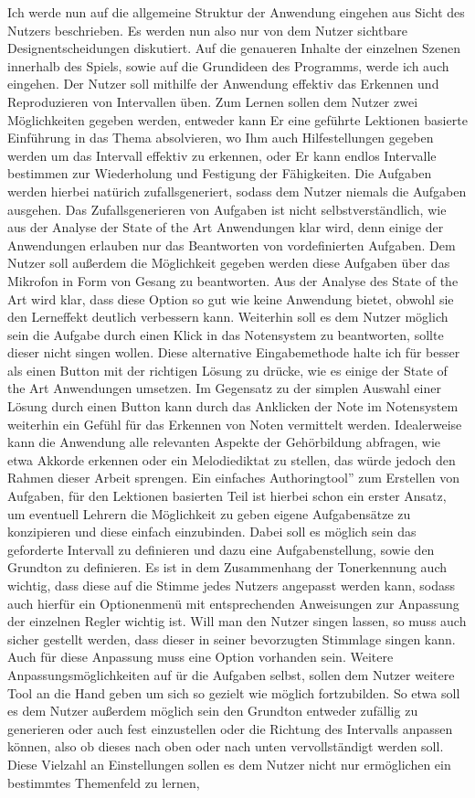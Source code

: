 Ich werde nun auf die allgemeine Struktur der Anwendung eingehen aus Sicht des Nutzers beschrieben. Es werden nun also nur von dem Nutzer sichtbare Designentscheidungen diskutiert. Auf die genaueren Inhalte der einzelnen Szenen innerhalb des Spiels, sowie auf die Grundideen des Programms, werde ich auch eingehen. Der Nutzer soll mithilfe der Anwendung effektiv das Erkennen und Reproduzieren von Intervallen üben. Zum Lernen sollen dem Nutzer zwei Möglichkeiten gegeben werden, entweder kann Er eine geführte Lektionen basierte Einführung in das Thema absolvieren, wo Ihm auch Hilfestellungen gegeben werden um das Intervall effektiv zu erkennen, oder Er kann endlos Intervalle bestimmen zur Wiederholung und Festigung der Fähigkeiten. Die Aufgaben werden hierbei natürich zufallsgeneriert, sodass dem Nutzer niemals die Aufgaben ausgehen. Das Zufallsgenerieren von Aufgaben ist nicht selbstverständlich, wie aus der Analyse der State of the Art Anwendungen klar wird, denn einige der Anwendungen erlauben nur das Beantworten von vordefinierten Aufgaben. Dem Nutzer soll außerdem die Möglichkeit gegeben werden diese Aufgaben über das Mikrofon in Form von Gesang zu beantworten. Aus der Analyse des State of the Art wird klar, dass diese Option so gut wie keine Anwendung bietet, obwohl sie den Lerneffekt deutlich verbessern kann. Weiterhin soll es dem Nutzer möglich sein die Aufgabe durch einen Klick in das Notensystem zu beantworten, sollte dieser nicht singen wollen. Diese alternative Eingabemethode halte ich für besser als einen Button mit der richtigen Lösung zu drücke, wie es einige der State of the Art Anwendungen umsetzen. Im Gegensatz zu der simplen Auswahl einer Lösung durch einen Button kann durch das Anklicken der Note im Notensystem weiterhin ein Gefühl für das Erkennen von Noten vermittelt werden. Idealerweise kann die Anwendung alle relevanten Aspekte der Gehörbildung abfragen, wie etwa Akkorde erkennen oder ein Melodiediktat zu stellen, das würde jedoch den Rahmen dieser Arbeit sprengen. Ein einfaches \glqq Authoringtool'' zum Erstellen von Aufgaben, für den Lektionen basierten Teil ist hierbei schon ein erster Ansatz, um eventuell Lehrern die Möglichkeit zu geben eigene Aufgabensätze zu konzipieren und diese einfach einzubinden. Dabei soll es möglich sein das geforderte Intervall zu definieren und dazu eine Aufgabenstellung, sowie den Grundton zu definieren. Es ist in dem Zusammenhang der Tonerkennung auch wichtig, dass diese auf die Stimme jedes Nutzers angepasst werden kann, sodass auch hierfür ein Optionenmenü mit entsprechenden Anweisungen zur Anpassung der einzelnen Regler wichtig ist. Will man den Nutzer singen lassen, so muss auch sicher gestellt werden, dass dieser in seiner bevorzugten Stimmlage singen kann. Auch für diese Anpassung muss eine Option vorhanden sein. Weitere Anpassungsmöglichkeiten auf ür die Aufgaben selbst, sollen dem Nutzer weitere Tool an die Hand geben um sich so gezielt wie möglich fortzubilden. So etwa soll es dem Nutzer außerdem möglich sein den Grundton entweder zufällig zu generieren oder auch fest einzustellen oder die Richtung des Intervalls anpassen können, also ob dieses nach oben oder nach unten vervollständigt werden soll. Diese Vielzahl an Einstellungen sollen es dem Nutzer nicht nur ermöglichen ein bestimmtes Themenfeld zu lernen, 